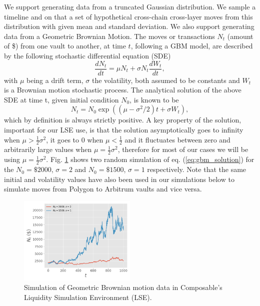 We support generating data from a truncated Gaussian distribution. We sample a timeline and on that a set of hypothetical cross-chain cross-layer moves from this distribution with given mean and standard deviation.
%
We also support generating data from a Geometric Brownian Motion.
%
The moves or transactions $N_t$ (amount of \$) from one vault to another, at time $t$, following a GBM model, are described by the following stochastic differential equation (SDE)
\begin{equation}
\frac{d N_t}{dt} = \mu N_t + \sigma N_t\frac{dW_t}{dt}, 
\end{equation}
with $\mu$ being a drift term, $\sigma$ the volatility, both assumed to be constants and $W_t$ is a Brownian motion stochastic process. The analytical solution of the above SDE at time t, given initial condition $N_0$, is known to be 
\begin{equation}
\label{eq:gbm_solution}
N_t = N_0 \exp\left( (\mu - \sigma^2 / 2)t + \sigma W_t\right),
\end{equation}
which by definition is always strictly positive. A key property of the solution, important for our LSE use, is that the solution asymptotically goes to infinity when $\mu > \frac{1}{2}\sigma^2$, it goes to $0$ when $\mu < \frac{1}{2}$ and it fluctuates between zero and arbitrarily large values when $\mu = \frac{1}{2}\sigma^2$, therefore for most of our cases we will be using $\mu = \frac{1}{2}\sigma^2$. Fig. \ref{fig:gbm} shows two random simulation of eq. (\ref{eq:gbm_solution}) for the $N_0 = \$2000$, $\sigma=2$ and $N_0=\$1500$, $\sigma=1$ respectively. Note that the same initial and volatility values have also been used in our simulations below to simulate moves from Polygon to Arbitrum vaults and vice versa.
%
\begin{figure}[h]
    \centering
    \includegraphics[width=0.5\textwidth]{images/gbms.png}
    \caption{Simulation of Geometric Brownian motion data in Composable's Liquidity Simulation Environment (LSE).}
    \label{fig:gbm}
\end{figure}
%

